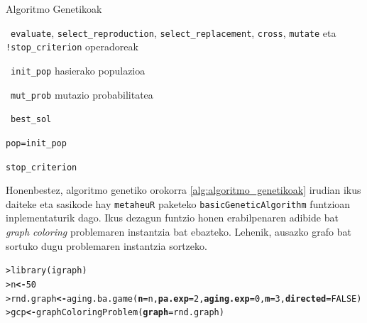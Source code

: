 \documentclass[eu]{ifirak}\usepackage[]{graphicx}\usepackage[]{color}
\makeatletter
\newcommand{\hlnum}[1]{\textcolor[rgb]{0.659,0.4,0.051}{#1}}%
\newcommand{\hlstd}[1]{\textcolor[rgb]{0,0,0}{#1}}%
\newcommand{\hlkwb}[1]{\textcolor[rgb]{0.549,0.114,0.412}{\textbf{#1}}}%
\newcommand{\hlkwc}[1]{\textcolor[rgb]{0.659,0.573,0.133}{\textbf{#1}}}%
\newcommand{\hlkwd}[1]{\textcolor[rgb]{0.659,0.133,0.482}{#1}}%
\newenvironment{kframe}{%
 \def\at@end@of@kframe{}%
 \ifinner\ifhmode%
  \def\at@end@of@kframe{\end{minipage}}%
  \begin{minipage}{\columnwidth}%
 \fi\fi%
 \def\FrameCommand##1{\hskip\@totalleftmargin \hskip-\fboxsep
 \colorbox{shadecolor}{##1}\hskip-\fboxsep
     \hskip-\linewidth \hskip-\@totalleftmargin \hskip\columnwidth}%
 \MakeFramed {\advance\hsize-\width
   \@totalleftmargin\z@ \linewidth\hsize
   \@setminipage}}%
 {\par\unskip\endMakeFramed%
 \at@end@of@kframe}
\newenvironment{knitrout}{}{} %
\newcommand{\code}[1]{\texttt{#1}}
\newcommand{\eng}[1]{\textit{#1}}
\makeatother
\begin{document}
\begin{ifalgorithm}[t]
\begin{ifpseudo}{Algoritmo Genetikoak}
\item \In\ \texttt{evaluate}, \texttt{select\_reproduction}, \texttt{select\_replacement}, \texttt{cross}, \texttt{mutate} eta \texttt{!stop\_criterion} operadoreak
\item \In\ \texttt{init\_pop} hasierako populazioa
\item \In\ \texttt{mut\_prob} mutazio probabilitatea
\item \Out\ \texttt{best\_sol}
\item \texttt{pop=init\_pop}
\item \While \texttt{stop\_criterion} \Do
\item {}
\item {}
\item {}
\item {}
\item {}
\item \T{\Done}
\item {}
\item {}
\item {}
\item \T{\EIf}
\item {}
\item \Done
\end{ifpseudo}
\caption{Algoritmo genetikoen sasikodea}\label{alg:algoritmo_genetikoak}
\end{ifalgorithm}

Honenbestez, algoritmo genetiko orokorra \ref{alg:algoritmo_genetikoak} irudian ikus daiteke eta sasikode hay \code{metaheuR} paketeko \code{basicGeneticAlgorithm} funtzioan inplementaturik dago. Ikus dezagun funtzio honen erabilpenaren adibide bat \eng{graph coloring} problemaren instantzia bat ebazteko. Lehenik, ausazko grafo bat sortuko dugu problemaren instantzia sortzeko.

\begin{knitrout}
\color{fgcolor}\begin{kframe}
\begin{alltt}
\hlstd{> }\hlkwd{library}\hlstd{(igraph)}
\hlstd{> }\hlstd{n} \hlkwb{<-} \hlnum{50}
\hlstd{> }\hlstd{rnd.graph} \hlkwb{<-} \hlkwd{aging.ba.game}\hlstd{(}\hlkwc{n}\hlstd{=n,} \hlkwc{pa.exp}\hlstd{=}\hlnum{2}\hlstd{,} \hlkwc{aging.exp}\hlstd{=}\hlnum{0}\hlstd{,} \hlkwc{m}\hlstd{=}\hlnum{3}\hlstd{,} \hlkwc{directed}\hlstd{=}\hlnum{FALSE}\hlstd{)}
\hlstd{> }\hlstd{gcp} \hlkwb{<-} \hlkwd{graphColoringProblem}\hlstd{(}\hlkwc{graph}\hlstd{=rnd.graph)}
\end{alltt}
\end{kframe}
\end{knitrout}
\end{document}
